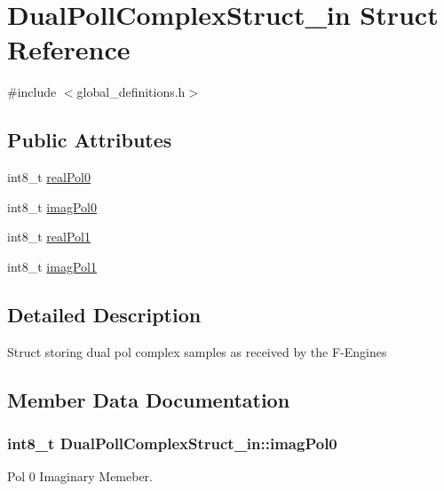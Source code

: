 \hypertarget{struct_dual_poll_complex_struct__in}{}\section{Dual\+Poll\+Complex\+Struct\+\_\+in Struct Reference}
\label{struct_dual_poll_complex_struct__in}


{\ttfamily \#include $<$global\+\_\+definitions.\+h$>$}

\subsection*{Public Attributes}
\begin{DoxyCompactItemize}
\item 
int8\+\_\+t \hyperlink{struct_dual_poll_complex_struct__in_a34f0b4c44324ee8f9d48317dd1c3649f}{real\+Pol0}
\item 
int8\+\_\+t \hyperlink{struct_dual_poll_complex_struct__in_afd4ecb546f03735bc2abe41df6854c63}{imag\+Pol0}
\item 
int8\+\_\+t \hyperlink{struct_dual_poll_complex_struct__in_a748ba48cc32cc2c47e0a1826b0de3cc3}{real\+Pol1}
\item 
int8\+\_\+t \hyperlink{struct_dual_poll_complex_struct__in_aa76ee741eabd163bd5c4a9356e6e7fc5}{imag\+Pol1}
\end{DoxyCompactItemize}


\subsection{Detailed Description}
Struct storing dual pol complex samples as received by the F-\/\+Engines 

\subsection{Member Data Documentation}
\subsubsection[{\texorpdfstring{imag\+Pol0}{imagPol0}}]{\setlength{\rightskip}{0pt plus 5cm}int8\+\_\+t Dual\+Poll\+Complex\+Struct\+\_\+in\+::imag\+Pol0}\hypertarget{struct_dual_poll_complex_struct__in_afd4ecb546f03735bc2abe41df6854c63}{}\label{struct_dual_poll_complex_struct__in_afd4ecb546f03735bc2abe41df6854c63}
Pol 0 Imaginary Memeber. 
